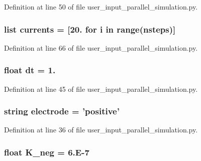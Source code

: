Definition at line 50 of file user\-\_\-input\-\_\-parallel\-\_\-simulation.\-py.

\hypertarget{namespaceuser__input__parallel__simulation_a216022bdba987f127b6cc081ee78e2bd}{
\subsubsection[{currents}]{\setlength{\rightskip}{0pt plus 5cm}list currents = \mbox{[}20. for i in range({\bf nsteps})\mbox{]}}}\label{namespaceuser__input__parallel__simulation_a216022bdba987f127b6cc081ee78e2bd}


Definition at line 66 of file user\-\_\-input\-\_\-parallel\-\_\-simulation.\-py.

\hypertarget{namespaceuser__input__parallel__simulation_a778e38aa889751afffa2dea6b803e67a}{
\subsubsection[{dt}]{\setlength{\rightskip}{0pt plus 5cm}float dt = 1.}}\label{namespaceuser__input__parallel__simulation_a778e38aa889751afffa2dea6b803e67a}


Definition at line 45 of file user\-\_\-input\-\_\-parallel\-\_\-simulation.\-py.

\hypertarget{namespaceuser__input__parallel__simulation_a6d9f4e281307eca8be6bad984ed9786d}{
\subsubsection[{electrode}]{\setlength{\rightskip}{0pt plus 5cm}string electrode = 'positive'}}\label{namespaceuser__input__parallel__simulation_a6d9f4e281307eca8be6bad984ed9786d}


Definition at line 36 of file user\-\_\-input\-\_\-parallel\-\_\-simulation.\-py.

\hypertarget{namespaceuser__input__parallel__simulation_a64d0c5854299798787675bc91586023c}{
\subsubsection[{K\-\_\-neg}]{\setlength{\rightskip}{0pt plus 5cm}float K\-\_\-neg = 6.\-E-\/7}}\label{namespaceuser__input__parallel__simulation_a64d0c5854299798787675bc91586023c}


